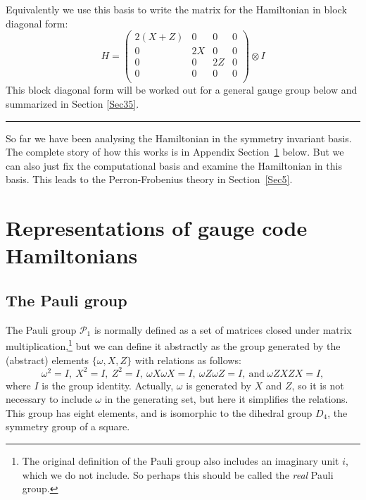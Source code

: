 \documentclass[11pt,oneside]{article}
\newcommand{\todo}[1]{\ \textcolor{red}{\{#1\}}\ }
\newcommand{\SRef}[1]{Section~\ref{#1}}
\def\Ham{H}
\def\Pauli{\mathcal{P}}
\newcommand\tombstone{\rule{.36em}{2ex}\vskip 5pt}
\begin{document}
Equivalently we use this basis to 
write the matrix for the Hamiltonian in
block diagonal form:
$$
\Ham = 
\left( \begin{array}{cccc}
2(X+Z) & 0 & 0 & 0 \\
0  & 2X & 0 & 0 \\
0  & 0 & 2Z & 0 \\
0  & 0 & 0 & 0 \\
\end{array} \right) \otimes I
$$
This block diagonal form will be worked out for
a general gauge group below and summarized in Section \ref{Sec35}.
\tombstone

So far we have been analysing the Hamiltonian in the
symmetry invariant basis. The complete story of how this
works is in Appendix \SRef{Sec3} below.
But we can also just fix the computational basis and
examine the Hamiltonian in this basis.
This leads to the Perron-Frobenius theory in \SRef{Sec5}.


\section{Representations of gauge code Hamiltonians}\label{Sec3}

\subsection{The Pauli group}\label{Sec31}

The Pauli group $\Pauli_1$ is normally 
defined as a set of matrices closed under
matrix multiplication,\footnote{The original definition of the Pauli
group also includes an imaginary unit $i$, which we
do not include. So perhaps this should be called the
\emph{real} Pauli group.}
but we can define it abstractly
as the group generated
by the (abstract) elements $\{\omega, X, Z\}$ with
relations as follows:
$$
\omega^2=I,\ X^2=I,\ Z^2=I,\ \omega X\omega X=I,\ \omega Z\omega Z=I,\ \mbox{and}\  \omega ZXZX=I,
$$
where $I$ is the group identity.
Actually, $\omega $ is generated by $X$ and $Z$,
so it is not necessary to include $\omega $ in the generating set,
but here it simplifies the relations.
This group has eight elements, and is isomorphic to the dihedral group $D_4$,
the symmetry group of a square.
\end{document}
